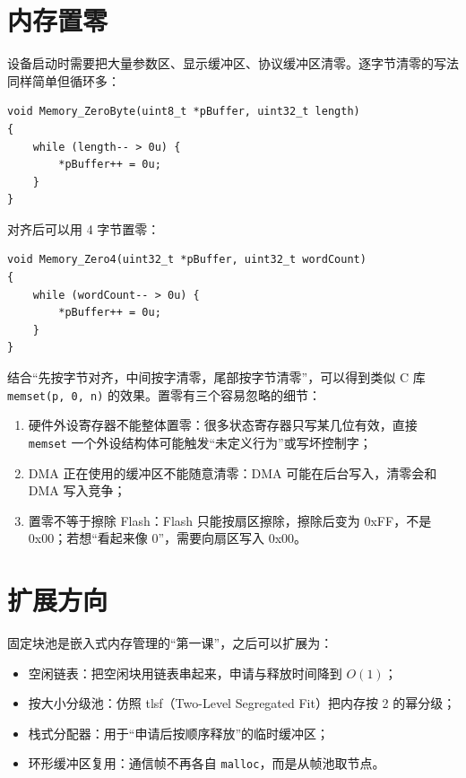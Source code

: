 \section{内存置零}

设备启动时需要把大量参数区、显示缓冲区、协议缓冲区清零。逐字节清零的写法同样简单但循环多：

\begin{lstlisting}[style=c]
void Memory_ZeroByte(uint8_t *pBuffer, uint32_t length)
{
    while (length-- > 0u) {
        *pBuffer++ = 0u;
    }
}
\end{lstlisting}

对齐后可以用 4 字节置零：

\begin{lstlisting}[style=c]
void Memory_Zero4(uint32_t *pBuffer, uint32_t wordCount)
{
    while (wordCount-- > 0u) {
        *pBuffer++ = 0u;
    }
}
\end{lstlisting}

结合“先按字节对齐，中间按字清零，尾部按字节清零”，可以得到类似 C 库 \texttt{memset(p, 0, n)} 的效果。置零有三个容易忽略的细节：

\begin{enumerate}
\item 硬件外设寄存器不能整体置零：很多状态寄存器只写某几位有效，直接 \texttt{memset} 一个外设结构体可能触发“未定义行为”或写坏控制字；
\item DMA 正在使用的缓冲区不能随意清零：DMA 可能在后台写入，清零会和 DMA 写入竞争；
\item 置零不等于擦除 Flash：Flash 只能按扇区擦除，擦除后变为 0xFF，不是 0x00；若想“看起来像 0”，需要向扇区写入 0x00。
\end{enumerate}

\section{扩展方向}

固定块池是嵌入式内存管理的“第一课”，之后可以扩展为：

\begin{itemize}
\item 空闲链表：把空闲块用链表串起来，申请与释放时间降到 $O(1)$；
\item 按大小分级池：仿照 tlsf（Two-Level Segregated Fit）把内存按 2 的幂分级；
\item 栈式分配器：用于“申请后按顺序释放”的临时缓冲区；
\item 环形缓冲区复用：通信帧不再各自 \texttt{malloc}，而是从帧池取节点。
\end{itemize}

